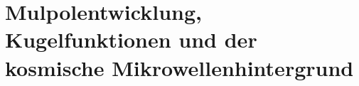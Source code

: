 %
%
%
\chapter{Mulpolentwicklung, Kugelfunktionen und der
kosmische Mikrowellenhintergrund
\label{skript:chapter:multipol}}
\rhead{}

